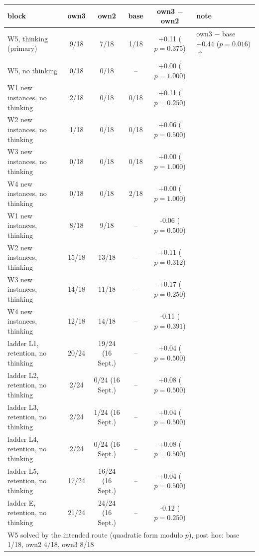 \begin{tabular}{lccccl}
\toprule
block & own3 & own2 & base & own3 $-$ own2 & note \\
\midrule
W5, thinking (primary) & 9/18 & 7/18 & 1/18 & +0.11 ($p=0.375$) & own3 $-$ base +0.44 ($p=0.016$)$\uparrow$ \\
W5, no thinking & 0/18 & 0/18 & -- & +0.00 ($p=1.000$) & \\
W1 new instances, no thinking & 2/18 & 0/18 & 0/18 & +0.11 ($p=0.250$) & \\
W2 new instances, no thinking & 1/18 & 0/18 & 0/18 & +0.06 ($p=0.500$) & \\
W3 new instances, no thinking & 0/18 & 0/18 & 0/18 & +0.00 ($p=1.000$) & \\
W4 new instances, no thinking & 0/18 & 0/18 & 2/18 & +0.00 ($p=1.000$) & \\
W1 new instances, thinking & 8/18 & 9/18 & -- & -0.06 ($p=0.500$) & \\
W2 new instances, thinking & 15/18 & 13/18 & -- & +0.11 ($p=0.312$) & \\
W3 new instances, thinking & 14/18 & 11/18 & -- & +0.17 ($p=0.250$) & \\
W4 new instances, thinking & 12/18 & 14/18 & -- & -0.11 ($p=0.391$) & \\
ladder L1, retention, no thinking & 20/24 & 19/24 (16 Sept.) & -- & +0.04 ($p=0.500$) & \\
ladder L2, retention, no thinking & 2/24 & 0/24 (16 Sept.) & -- & +0.08 ($p=0.500$) & \\
ladder L3, retention, no thinking & 2/24 & 1/24 (16 Sept.) & -- & +0.04 ($p=0.500$) & \\
ladder L4, retention, no thinking & 2/24 & 0/24 (16 Sept.) & -- & +0.08 ($p=0.500$) & \\
ladder L5, retention, no thinking & 17/24 & 16/24 (16 Sept.) & -- & +0.04 ($p=0.500$) & \\
ladder E, retention, no thinking & 21/24 & 24/24 (16 Sept.) & -- & -0.12 ($p=0.250$) & \\
\midrule
\multicolumn{6}{l}{W5 solved by the intended route (quadratic form modulo $p$), post hoc: base 1/18, own2 4/18, own3 8/18} \\
\bottomrule
\end{tabular}
